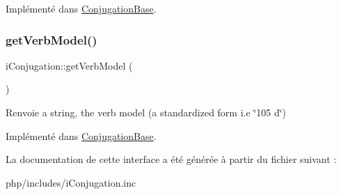 Implémenté dans \hyperlink{classConjugationBase_a918aff5acf4210cf363a13cf39e2430d}{Conjugation\+Base}.

\hypertarget{interfaceiConjugation_ab5482cc8f8e9f58dc852aff604813b6e}{}\label{interfaceiConjugation_ab5482cc8f8e9f58dc852aff604813b6e} 
\subsubsection{\texorpdfstring{get\+Verb\+Model()}{getVerbModel()}}
{\footnotesize\ttfamily i\+Conjugation\+::get\+Verb\+Model (\begin{DoxyParamCaption}{ }\end{DoxyParamCaption})}

\begin{DoxyReturn}{Renvoie}
a string, the verb model (a standardized form i.\+e \char`\"{}105 d\char`\"{}) 
\end{DoxyReturn}


Implémenté dans \hyperlink{classConjugationBase_aaa7ecb3341682d48f2d2b42810de2ac2}{Conjugation\+Base}.



La documentation de cette interface a été générée à partir du fichier suivant \+:\begin{DoxyCompactItemize}
\item 
php/includes/i\+Conjugation.\+inc\end{DoxyCompactItemize}
